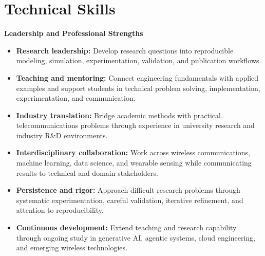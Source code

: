 \documentclass[9pt,letterpaper]{extarticle}
\begin{document}
\section{Technical Skills}
\par
{}\par
{}\par
{}\par
{}\par
{}\par
{}\textbf{Leadership and Professional Strengths}\par
\begin{itemize}
\item \textbf{Research leadership:} Develop research questions into reproducible modeling, simulation, experimentation, validation, and publication workflows.
\item \textbf{Teaching and mentoring:} Connect engineering fundamentals with applied examples and support students in technical problem solving, implementation, experimentation, and communication.
\item \textbf{Industry translation:} Bridge academic methods with practical telecommunications problems through experience in university research and industry R\&D environments.
\item \textbf{Interdisciplinary collaboration:} Work across wireless communications, machine learning, data science, and wearable sensing while communicating results to technical and domain stakeholders.
\item \textbf{Persistence and rigor:} Approach difficult research problems through systematic experimentation, careful validation, iterative refinement, and attention to reproducibility.
\item \textbf{Continuous development:} Extend teaching and research capability through ongoing study in generative AI, agentic systems, cloud engineering, and emerging wireless technologies.
\end{itemize}
\end{document}
